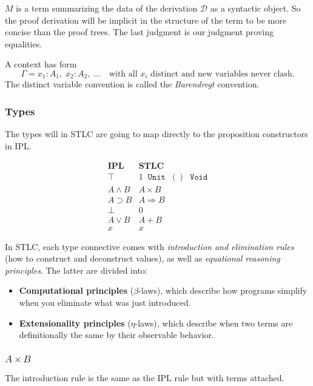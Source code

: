 \documentclass[12pt]{article}
\begin{document}
$M$ is a term summarizing the data of the derivation $\mathcal{D}$ as a syntactic object. So the proof derivation will be implicit in the structure of the term to be more concise than the proof trees. The last judgment is our judgment proving equalities.

A context has form
\[
  \Gamma = x_1:A_1, \; x_2:A_2, \; \ldots
  \quad\text{with all } x_i \text{ distinct and new variables never clash.}
\]
The distinct variable convention is called the \emph{Barendregt} convention.

\subsubsection{Types}
The types will in STLC are going to map directly to the proposition constructors in IPL.

\[
\begin{array}{ll}
\textbf{IPL} & \textbf{STLC} \\[6pt]

\top & 1 \;\; \texttt{Unit} \;\; () \;\; \texttt{Void} \\[6pt]

A \wedge B & A \times B \\[6pt]

A \supset B &
A \Rightarrow B \\[6pt]

\bot & 0 \\

A \vee B & A + B \\
x & x
\end{array}
\]

In STLC, each type connective comes with
\emph{introduction and elimination rules} (how to construct and deconstruct values),
as well as \emph{equational reasoning principles}.
The latter are divided into:
\begin{itemize}
  \item \textbf{Computational principles} (\(\beta\)-laws), which describe how programs simplify when you
        eliminate what was just introduced.
  \item \textbf{Extensionality principles} (\(\eta\)-laws), which describe when two terms
        are definitionally the same by their observable behavior.
\end{itemize}

\subsubsection{$A \times B$}
The introduction rule is the same as the IPL rule but with terms attached.
\end{document}
